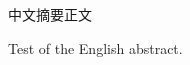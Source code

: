\begin{cabstract}
	中文摘要正文
	\pkuthssffaq
\end{cabstract}
\begin{eabstract}
	Test of the English abstract.
\end{eabstract}